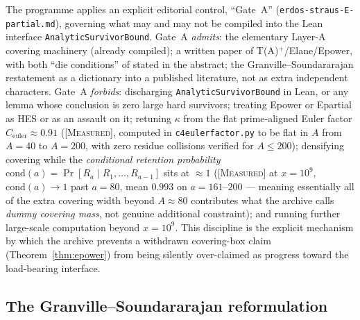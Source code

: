 \documentclass[11pt]{article}
\theoremstyle{plain}
\theoremstyle{definition}
\theoremstyle{remark}
\newcommand{\MEASURED}{\textcolor{claimed}{\textsc{[Measured]}}}
\newcommand{\file}[1]{\texttt{#1}}
\newcommand{\lean}[1]{\texttt{#1}}
\renewcommand{\_}{\textunderscore\allowbreak}
\begin{document}
The programme applies an explicit editorial control, ``Gate~A'' (\texttt{erdos-\allowbreak straus-\allowbreak E-\allowbreak partial.md}),
governing what may and may not be compiled into the Lean interface
\lean{AnalyticSurvivorBound}. Gate~A \emph{admits}: the elementary Layer-A covering machinery
(already compiled); a written paper of T(A)$^+$/E\_lane/E\_power, with both ``die conditions'' of
 stated in the abstract; the Granville--Soundararajan restatement as a
dictionary into a published literature, not as extra independent characters. Gate~A
\emph{forbids}: discharging
\lean{AnalyticSurvivorBound} in Lean, or any lemma whose conclusion is zero large hard
survivors; treating E\_power or E\_partial as H\_ES or as an assault on it; retuning $\kappa$
from the flat prime-aligned Euler factor $C_{\mathrm{euler}}\approx0.91$ (\MEASURED{}, computed
in \file{c4\_euler\_factor.py} to be flat in $A$ from $A=40$ to $A=200$, with zero residue
collisions verified for $A\le200$); densifying covering while the \emph{conditional retention
probability} $\mathrm{cond}(a)=\Pr[R_a\mid R_1,\dots,R_{a-1}]$ sits at $\approx1$ (\MEASURED{} at
$x=10^9$, $\mathrm{cond}(a)\to1$ past $a=80$, mean $0.993$ on $a=161$--$200$ — meaning
essentially all of the extra covering width beyond $A\approx80$ contributes what the archive
calls \emph{dummy covering mass}, not genuine additional constraint); and running further
large-scale computation beyond $x=10^9$. This discipline is the explicit mechanism by which the
archive prevents a withdrawn covering-box claim (Theorem~\ref{thm:epower}) from being
silently over-claimed as progress toward the load-bearing interface.

\subsection{The Granville--Soundararajan reformulation}
\label{subsec:gs}
\end{document}
